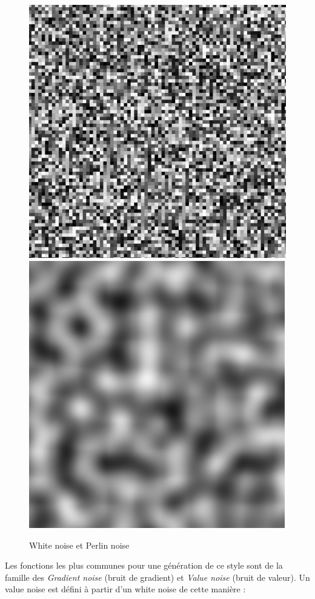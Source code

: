 \documentclass[11pt]{article} %
\begin{document}
\begin{figure}[h]
	\centering
	\includegraphics[scale=.49]{white_noise}
	\includegraphics[scale=.49]{perlin_noise}
	\caption{White noise et Perlin noise}
	\label{fig:noises}
\end{figure}

Les fonctions les plus communes pour une génération de ce style sont de la famille des \textit{Gradient noise} (bruit de gradient) et \textit{Value noise} (bruit de valeur).
Un value noise est défini à partir d'un white noise de cette manière :
\end{document}
